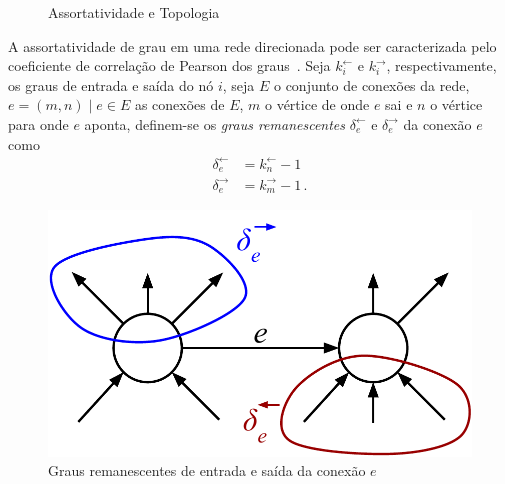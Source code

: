 \documentclass[
  article,
  11pt,
  a4paper,
  english,
  brazil,
  sumario=tradicional]{abntex2}
\begin{document}
\begin{figure}[ht]
    \centering
    \caption{Assortatividade e Topologia}
\end{figure}

A assortatividade de grau em uma rede direcionada pode ser caracterizada pelo coeficiente de correlação de Pearson dos graus~\cite{Barabasi2016-rn}. Seja $k_i^\leftarrow$ e $k_i^\rightarrow$,  respectivamente, os graus de entrada e saída do nó $i$, seja $E$ o conjunto de conexões da rede, $e = (m, n) \mid e \in E$ as conexões de $E$, $m$ o vértice de onde $e$ sai e $n$ o vértice para onde $e$ aponta, definem-se os \textit{graus remanescentes} $\delta_e^\leftarrow$ e $\delta_e^\rightarrow$ da conexão $e$ como
\begin{align*}
\delta_e^\leftarrow &= k_n^\leftarrow - 1
\\
\delta_e^\rightarrow &= k_m^\rightarrow - 1\,.
\end{align*}

\begin{figure}[ht]
    \centering
    \includegraphics[scale=0.4]{remaining-degree.pdf}
    \caption{Graus remanescentes de entrada e saída da conexão $e$}
    \label{fig:remaining-degree}
\end{figure}
\end{document}

